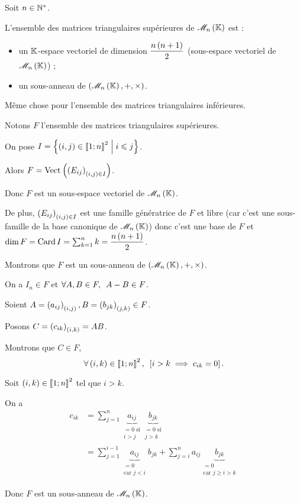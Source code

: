 \begin{prop}
Soit \(n\in\mathbb{N}^*\).

L'ensemble des matrices triangulaires supérieures de \(\M{n}\) est :

\begin{itemize}
\item un \(\mathbb{K}\)-espace vectoriel de dimension \(\dfrac{n\left(n+1\right)}{2}\) (sous-espace vectoriel de \(\M{n}\)) ; \\

\item un sous-anneau de \(\anneau{\M{n}}\).
\end{itemize}

Même chose pour l'ensemble des matrices triangulaires inférieures.
\end{prop}

\begin{dem}
Notons \(F\) l'ensemble des matrices triangulaires supérieures.

On pose \(I=\left\lbrace\left(i,j\right)\in\left\llbracket1;n\right\rrbracket^2\;\middle|\; i\leqslant j\right\rbrace\).

Alors \(F=\Vect{\paren{E_{ij}}_{\paren{i,j}\in I}}\).

Donc \(F\) est un sous-espace vectoriel de \(\M{n}\).

De plus, \(\left(E_{ij}\right)_{\left(i,j\right)\in I}\) est une famille génératrice de \(F\) et libre (car c'est une sous-famille de la base canonique de \(\M{n}\)) donc c'est une base de \(F\) et \(\dim F=\operatorname{Card} I=\sum_{k=1}^nk=\dfrac{n\left(n+1\right)}{2}\).

Montrons que \(F\) est un sous-anneau de \(\anneau{\M{n}}\).

On a \(I_n\in F\) et \(\quantifs{\forall A,B\in F}A-B\in F\).

Soient \(A=\left(a_{ij}\right)_{\left(i,j\right)},B=\left(b_{jk}\right)_{\left(j,k\right)}\in F\).

Posons \(C=\left(c_{ik}\right)_{\left(i,k\right)}=AB\).

Montrons que \(C\in F\), \cad \[\quantifs{\forall\paren{i,k}\in\interventierii{1}{n}^2}\croch{i>k\imp c_{ik}=0}.\]

Soit \(\left(i,k\right)\in\left\llbracket1;n\right\rrbracket^2\) tel que \(i>k\).

On a \[\begin{aligned}
c_{ik}&=\sum_{j=1}^n\underbrace{a_{ij}}_{\substack{=0\text{ si} \\ i>j}}\underbrace{b_{jk}}_{\substack{=0\text{ si} \\ j>k}} \\
&=\sum_{j=1}^{i-1}\underbrace{a_{ij}}_{\substack{=0 \\ \text{car }j<i}}b_{jk}+\sum_{j=i}^{n}a_{ij}\underbrace{b_{jk}}_{\substack{=0 \\ \text{car }j\geq i>k}}
\end{aligned}\]

Donc \(F\) est un sous-anneau de \(\M{n}\).
\end{dem}

